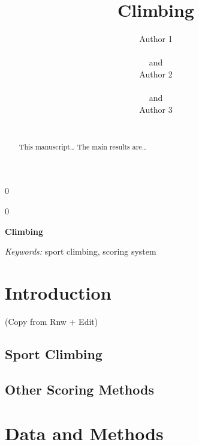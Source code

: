 \documentclass[12pt]{article}
\newcommand{\blind}{0}
\begin{document}
\def\spacingset#1{\renewcommand{\baselinestretch}%
{#1}\small\normalsize} \spacingset{1}



\blind
{
  \title{\bf Climbing}

  \author{
        Author 1 \\
    \\
     and \\     Author 2 \\
    \\
     and \\     Author 3 \\
    \\
      }
  \maketitle
} \fi

\blind
{
  \bigskip
  \bigskip
  \bigskip
  \begin{center}
    {\LARGE\bf Climbing}
  \end{center}
  \medskip
} \fi

\bigskip
\begin{abstract}
This manuscript\ldots{} The main results are\ldots{}
\end{abstract}

\noindent%
{\it Keywords:} sport climbing, scoring system
\vfill

\newpage
\spacingset{1.45} %

\hypertarget{introduction}{%
\section{Introduction}\label{introduction}}

(Copy from Rnw + Edit)

\hypertarget{sport-climbing}{%
\subsection{Sport Climbing}\label{sport-climbing}}

\hypertarget{other-scoring-methods}{%
\subsection{Other Scoring Methods}\label{other-scoring-methods}}

\hypertarget{data-and-methods}{%
\section{Data and Methods}\label{data-and-methods}}
\end{document}
